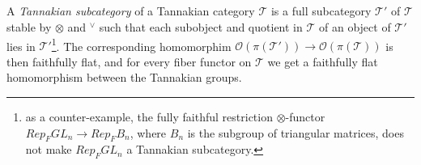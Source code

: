 \documentclass[../main.tex]{subfiles}
\begin{document}
\subsection{} A \emph{Tannakian subcategory} of a Tannakian category $\mathcal{T}$ is a full subcategory $\mathcal{T}'$ of $\mathcal{T}$ stable by $\otimes$ and $^{\vee}$ such that each subobject and quotient in $\mathcal{T}$ of an object of $\mathcal{T}'$ lies in $\mathcal{T}'$\footnote{as a counter-example, the fully faithful restriction $\otimes$-functor $Rep_F GL_n \to Rep_F B_n$, where $B_n$ is the subgroup of triangular matrices, does not make $Rep_F GL_n$ a Tannakian subcategory.}.
The corresponding homomorphim $\mathcal{O}(\pi(\mathcal{T}')) \to \mathcal{O}(\pi(\mathcal{T}))$ is then faithfully flat, and for every fiber functor on $\mathcal{T}$ we get a faithfully flat homomorphism between the Tannakian groups.
\end{document}
